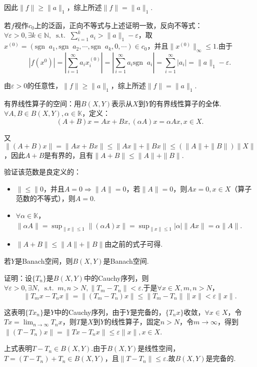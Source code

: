 \documentclass[bwprint, withoutpreface]{cumcmthesis}
\newcommand*{\st}{\mathop{}\!\mathrm{s.t.}\!\mathop{}}
\newcommand*{\norm}[1]{\| #1 \|}
\newcommand*{\nnorm}[2]{\| #1 \|_{#2}}
\newcommand*{\sgn}[1]{\mathrm{sgn}\!\mathop{}#1}
\begin{document}
因此$\norm{f} \geqslant \nnorm{a}{1}$，综上所述$\norm{f} = \nnorm{a}{1}$.

若$f$视作$c_0$上的泛函，正向不等式与上述证明一致，反向不等式：$\forall \varepsilon > 0, \exists k \in \mathbb{N}, \st \sum_{i = 1}^{k}{a_i} > \nnorm{a}{1} - \varepsilon$，取$x^{(0)} = (\sgn{a_1}, \sgn{a_2}, \cdots, \sgn{a_k}, 0, \cdots) \in c_0$，并且$\nnorm{x^{(0)}}{\infty} \leqslant 1$.由于
\begin{equation*}
	|f(x^{0})| = |\sum_{i = 1}^{\infty}{a_i x_i^{(0)}}| = |\sum_{i = 1}^{\infty}{a_i \sgn{a_i}}| = \sum_{i = 1}^{\infty}{|a_i|} = \nnorm{a}{1} - \varepsilon.
\end{equation*}

由$\varepsilon > 0$的任意性，$\norm{f} \geqslant \nnorm{a}{1}$，综上所述$\norm{f} = \nnorm{a}{1}$.

有界线性算子的空间：用$B(X, Y)$表示从$X$到$Y$的有界线性算子的全体.$\forall A, B \in B(X, Y), \alpha \in \mathbb{K}$，定义：
\begin{equation*}
	(A + B)x = Ax + Bx, (\alpha A)x = \alpha A x, x \in X.
\end{equation*}

又$\norm{(A + B)x} = \norm{Ax + Bx} \leqslant \norm{Ax} + \norm{Bx} \leqslant (\norm{A} + \norm{B})\norm{X}$，因此$A + B$是有界的，且有$\norm{A + B} \leqslant \norm{A} + \norm{B}$.

验证该范数是良定义的：
\begin{itemize}[itemindent=2em]
	\item $\norm \leqslant 0$，并且$A = 0 \Rightarrow \norm{A} = 0$，若$\norm{A} = 0$，则$Ax = 0, x \in X$（算子范数的不等式），则$A = 0$.
	\item $\forall \alpha \in \mathbb{K}$，$\norm{\alpha A} = \sup_{\norm{x} \leqslant 1}{\norm{(\alpha A) x}} = \sup_{\norm{x} \leqslant 1}{|\alpha| \norm{Ax}} = \alpha \norm{A}$.
	\item $\norm{A + B} \leqslant \norm{A} + \norm{B}$由之前的式子可得.
\end{itemize}

若$Y$是Banach空间，则$B(X, Y)$是Banach空间.

证明：设$\{T_n\}$是$B(X, Y)$中的Cauchy序列，则$\forall \varepsilon > 0, \exists N, \st m, n > N, \norm{T_m - T_n} < \varepsilon$.于是$\forall x \in X, m, n > N$，\[\norm{T_m x - T_n x} = \norm{(T_m - T_n)x} \leqslant \norm{T_m - T_n} \norm{x} < \varepsilon \norm{x}.\]

这表明$\{T x_n\}$是$Y$中的Cauchy序列，由于$Y$是完备的，$\{T_n x\}$收敛，$\forall x \in X$，令$Tx = \lim_{n \to \infty}{T_n x}$，则$T$是$X$到$Y$的线性算子，固定$n > N$，令$m \to \infty$，得到$\norm{(T - T_n)x} = \norm{Tx - T_n x} \leqslant \varepsilon \norm{x}, x \in X$.

上式表明$T - T_n \in B(X, Y)$.由于$B(X, Y)$是线性空间，$T = (T - T_n) + T_n \in B(X, Y)$，且$\norm{T - T_n} \leqslant \varepsilon.$故$B(X, Y)$是完备的.
\end{document}
